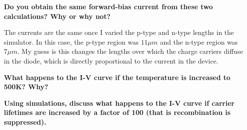 \documentclass{IEEEtran}
\begin{document}
\textbf{Do you obtain the same forward-bias current from these two calculations? Why or why not?}

The currents are the same once I varied the p-type and n-type lengths in the simulator. In this case, the p-type region was \(11 \mu m\) and the n-type region was \(7 \mu m\). My guess is this changes the lengths over which the charge carriers diffuse in the diode, which is directly proportional to the current in the device.

\textbf{What happens to the I-V curve if the temperature is increased to 500K? Why?}

\textbf{Using simulations, discuss what happens to the I-V curve if carrier lifetimes are increased by a factor of 100 (that is recombination is suppressed). }



\end{document}
